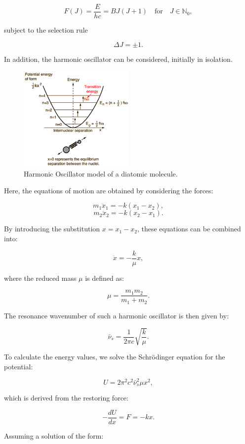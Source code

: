 \documentclass{article}
\begin{document}
\[
F(J) = \frac{E}{hc} = BJ(J + 1) \quad \text{for} \quad J \in \mathbb{N}_0,
\]

subject to the selection rule

\[
\Delta J = \pm1.
\]

\pagebreak{}

In addition, the harmonic oscillator can be considered, initially in isolation.

\begin{figure}[h]
	\centering
	\includegraphics[width=0.5\textwidth]{Figures/Introduction/qhar.png}
	\caption{Harmonic Oscillator model of a diatomic molecule. \cite{nave_quantum}}
	\label{fig:harmonic_oscillator}
\end{figure}

Here, the equations of motion are obtained by considering the forces:

\[
m_1 \ddot{x}_1 = -k(x_1 - x_2),
\]
\[
m_2 \ddot{x}_2 = -k(x_2 - x_1).
\]

By introducing the substitution \( x = x_1 - x_2 \), these equations can be combined into:

\[
\ddot{x} = -\frac{k}{\mu} x,
\]

where the reduced mass \(\mu\) is defined as:

\[
\mu = \frac{m_1 m_2}{m_1 + m_2}.
\]

The resonance wavenumber of such a harmonic oscillator is then given by:

\[
\bar{\nu}_s = \frac{1}{2\pi c} \sqrt{\frac{k}{\mu}}.
\]

To calculate the energy values, we solve the Schrödinger equation for the potential:

\[
U = 2\pi^2 c^2 \bar{\nu}_s^2 \mu x^2,
\]

which is derived from the restoring force:

\[
- \frac{dU}{dx} = F = -k x.
\]

Assuming a solution of the form:
\end{document}
